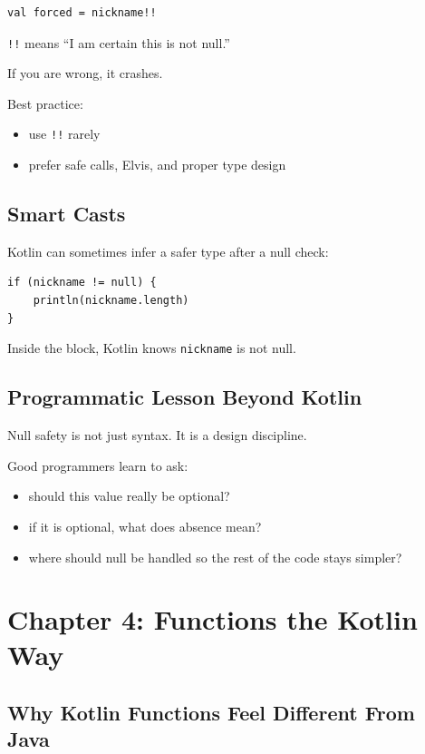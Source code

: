 \documentclass[11pt,a4paper]{article}
\begin{document}
\begin{lstlisting}[style=kazekotlin]
val forced = nickname!!
\end{lstlisting}

\texttt{!!} means ``I am certain this is not null.''

If you are wrong, it crashes.

Best practice:
\begin{itemize}
    \item use \texttt{!!} rarely
    \item prefer safe calls, Elvis, and proper type design
\end{itemize}

\subsection{Smart Casts}

Kotlin can sometimes infer a safer type after a null check:

\begin{lstlisting}[style=kazekotlin]
if (nickname != null) {
    println(nickname.length)
}
\end{lstlisting}

Inside the block, Kotlin knows \texttt{nickname} is not null.

\subsection{Programmatic Lesson Beyond Kotlin}

Null safety is not just syntax. It is a design discipline.

Good programmers learn to ask:
\begin{itemize}
    \item should this value really be optional?
    \item if it is optional, what does absence mean?
    \item where should null be handled so the rest of the code stays simpler?
\end{itemize}

\section{Chapter 4: Functions the Kotlin Way}

\subsection{Why Kotlin Functions Feel Different From Java}
\end{document}
